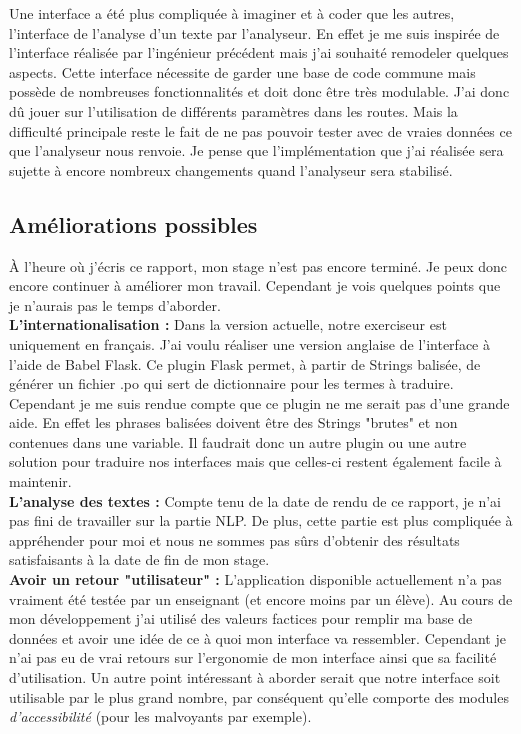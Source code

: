 \documentclass[12pt]{article}
\begin{document}
Une interface a été plus compliquée à imaginer et à coder que les autres, l'interface de l'analyse d'un texte par l'analyseur. En effet je me suis inspirée de l'interface réalisée par l'ingénieur précédent mais j'ai souhaité remodeler quelques aspects. Cette interface nécessite de garder une base de code commune mais possède de nombreuses fonctionnalités et doit donc être très modulable. J'ai donc dû jouer sur l'utilisation de différents paramètres dans les routes. Mais la difficulté principale reste le fait de ne pas pouvoir tester avec de vraies données ce que l'analyseur nous renvoie. Je pense que l'implémentation que j'ai réalisée sera sujette à encore nombreux changements quand l'analyseur sera stabilisé. 

\subsection{Améliorations possibles}
À l’heure où j’écris ce rapport, mon stage n’est pas encore terminé. Je peux donc encore continuer à améliorer mon travail. Cependant je vois quelques points que je n’aurais pas le temps d’aborder. \\

\textbf{L’internationalisation :} Dans la version actuelle, notre exerciseur est uniquement en français. J’ai voulu réaliser une version anglaise de l’interface à l’aide de Babel Flask. Ce plugin Flask permet, à partir de Strings balisée, de générer un fichier .po qui sert de dictionnaire pour les termes à traduire. Cependant je me suis rendue compte que ce plugin ne me serait pas d’une grande aide. En effet les phrases balisées doivent être des Strings "brutes" et non contenues dans une variable. Il faudrait donc un autre plugin ou une autre solution pour traduire nos interfaces mais que celles-ci restent également facile à maintenir. \\

\textbf{L'analyse des textes :}  Compte tenu de la date de rendu de ce rapport, je n'ai pas fini de travailler sur la partie NLP. De plus, cette partie est plus compliquée à appréhender pour moi et nous ne sommes pas sûrs d'obtenir des résultats satisfaisants à la date de fin de mon stage. \\

\textbf{Avoir un retour "utilisateur" :} L'application disponible actuellement n'a pas vraiment été testée par un enseignant (et encore moins par un élève). Au cours de mon développement j'ai utilisé des valeurs factices pour remplir ma base de données et avoir une idée de ce à quoi mon interface va ressembler. Cependant je n'ai pas eu de vrai retours sur l'ergonomie de mon interface ainsi que sa facilité d'utilisation. 
Un autre point intéressant à aborder serait que notre interface soit utilisable par le plus grand nombre, par conséquent qu'elle comporte des modules \textit{d'accessibilité} (pour les malvoyants par exemple). 
\end{document}
